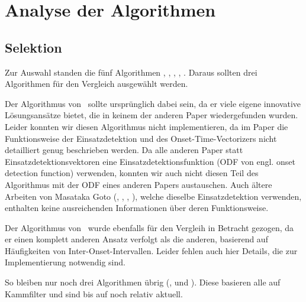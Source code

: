 \chapter{Analyse der Algorithmen}
\label{analyse}


\section{Selektion}
{
	Zur Auswahl standen die fünf Algorithmen \cite{2000_Di}, \cite{2001_Go}, \cite{2001_BeatThis}, \cite{2009_DaPlSt}, \cite{2011_PlRoSt}.
	Daraus sollten drei Algorithmen für den Vergleich ausgewählt werden.

	Der Algorithmus von~\cite{2001_Go} sollte ursprünglich dabei sein,
		da er viele eigene innovative Lösungsansätze bietet,
		die in keinem der anderen Paper wiedergefunden wurden.
	Leider konnten wir diesen Algorithmus nicht implementieren,
		da im Paper die Funktionsweise der Einsatzdetektion und des Onset-Time-Vectorizers
		nicht detailliert genug beschrieben werden.
	Da alle anderen Paper statt Einsatzdetektionsvektoren eine Einsatzdetektionsfunktion (ODF von engl. onset detection function) verwenden,
		konnten wir auch nicht diesen Teil des Algorithmus mit der ODF eines anderen Papers austauschen.
	Auch ältere Arbeiten von Masataka Goto (\cite{1994_GoMu}, \cite{1995_GoMu1}, \cite{1996_GoMu}, \cite{1997_GoMu2}),
		welche dieselbe Einsatzdetektion verwenden,
		enthalten keine ausreichenden Informationen über deren Funktionsweise.

	Der Algorithmus von~\cite{2000_Di} wurde ebenfalls für den Vergleih in Betracht gezogen,
		da er einen komplett anderen Ansatz verfolgt als die anderen,
		basierend auf Häufigkeiten von Inter-Onset-Intervallen.
	Leider fehlen auch hier Details,
		die zur Implementierung notwendig sind.

	So bleiben nur noch drei Algorithmen übrig (\cite{2001_BeatThis}, \cite{2009_DaPlSt} und \cite{2011_PlRoSt}).
	Diese basieren alle auf Kammfilter und sind bis auf \cite{2001_BeatThis} noch relativ aktuell.
}

